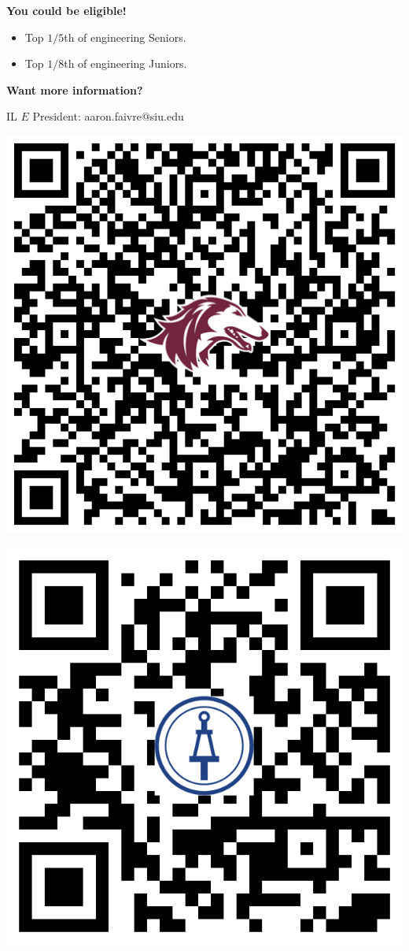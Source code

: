 \documentclass[14pt]{extarticle}
\begin{document}
\bigskip
{\large \textbf{You could be eligible!}}

\begin{itemize}
    \item Top \( 1/5 \)th of engineering Seniors.
    \item Top \( 1/8 \)th of engineering Juniors.
\end{itemize}

\bigskip
{\large \textbf{Want more information?}}

\smallskip
IL \( E \) President: aaron.faivre@siu.edu

\bigskip
\begin{minipage}{0.45\textwidth}
    \centering 
        \includegraphics[scale=0.2184]{saluki-qr.png}
\end{minipage}
\hfill 
\begin{minipage}{0.45\textwidth}
    \centering 
        \includegraphics[scale=0.18]{tbp-qr.png}
\end{minipage}
\end{document}
